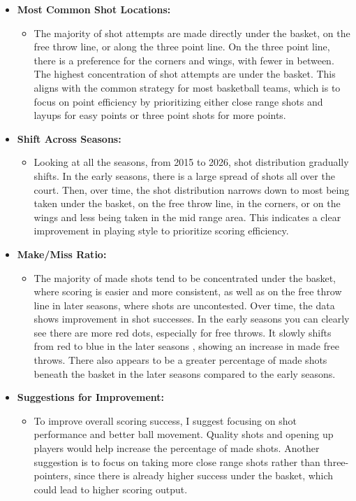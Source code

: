 \documentclass[
]{article}
\providecommand{\tightlist}{%
  \setlength{\itemsep}{0pt}\setlength{\parskip}{0pt}}
\begin{document}
\begin{itemize}
\item
  \textbf{Most Common Shot Locations:}

  \begin{itemize}
  \tightlist
  \item
    The majority of shot attempts are made directly under the basket, on
    the free throw line, or along the three point line. On the three
    point line, there is a preference for the corners and wings, with
    fewer in between. The highest concentration of shot attempts are
    under the basket. This aligns with the common strategy for most
    basketball teams, which is to focus on point efficiency by
    prioritizing either close range shots and layups for easy points or
    three point shots for more points.
  \end{itemize}
\item
  \textbf{Shift Across Seasons:}

  \begin{itemize}
  \tightlist
  \item
    Looking at all the seasons, from 2015 to 2026, shot distribution
    gradually shifts. In the early seasons, there is a large spread of
    shots all over the court. Then, over time, the shot distribution
    narrows down to most being taken under the basket, on the free throw
    line, in the corners, or on the wings and less being taken in the
    mid range area. This indicates a clear improvement in playing style
    to prioritize scoring efficiency.
  \end{itemize}
\item
  \textbf{Make/Miss Ratio:}

  \begin{itemize}
  \tightlist
  \item
    The majority of made shots tend to be concentrated under the basket,
    where scoring is easier and more consistent, as well as on the free
    throw line in later seasons, where shots are uncontested. Over time,
    the data shows improvement in shot successes. In the early seasons
    you can clearly see there are more red dots, especially for free
    throws. It slowly shifts from red to blue in the later seasons ,
    showing an increase in made free throws. There also appears to be a
    greater percentage of made shots beneath the basket in the later
    seasons compared to the early seasons.
  \end{itemize}
\item
  \textbf{Suggestions for Improvement:}

  \begin{itemize}
  \tightlist
  \item
    To improve overall scoring success, I suggest focusing on shot
    performance and better ball movement. Quality shots and opening up
    players would help increase the percentage of made shots. Another
    suggestion is to focus on taking more close range shots rather than
    three-pointers, since there is already higher success under the
    basket, which could lead to higher scoring output.
  \end{itemize}
\end{itemize}
\end{document}
